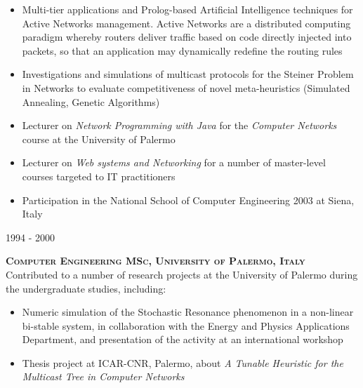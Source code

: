 \documentclass[11pt]{article}
\renewcommand{\subsection}[2]%
        {
         {\bf{\raggedright \scshape #1}}{\bf{\hfill \scshape #2}}\\[-.7\baselineskip]
}
\newenvironment{CompactItemize} {
  \begin{itemize}
  \setlength{\itemsep}{-3pt}
  \setlength{\parsep}{0pt}
  \setlength{\topsep}{-2pt}
  \setlength{\partopsep}{-2pt}
} {\end{itemize}}
\begin{document}
\begin{CompactItemize}
\item Multi-tier applications and Prolog-based Artificial Intelligence techniques for Active Networks management.
  Active Networks are a distributed computing paradigm whereby routers deliver traffic based on code directly
  injected into packets, so that an application may dynamically redefine the routing rules
\item Investigations and simulations of multicast protocols for the Steiner Problem in Networks
  to evaluate competitiveness of novel meta-heuristics (Simulated Annealing, Genetic Algorithms)
\item Lecturer on \emph{Network Programming with Java} for the \emph{Computer Networks} course at the University of Palermo
\item Lecturer on \emph{Web systems and Networking} for a number of master-level courses targeted to IT practitioners
\item Participation in the National School of Computer Engineering 2003 at Siena, Italy
\end{CompactItemize}

\subsection{1994 - 2000}{Computer Engineering MSc, University of Palermo, Italy}

Contributed to a number of research projects at the University of Palermo during the undergraduate studies, including:

\begin{CompactItemize}
\item Numeric simulation of the Stochastic Resonance phenomenon in a non-linear bi-stable system,
  in collaboration with the Energy and Physics Applications Department, and presentation of the activity at an international workshop
\item Thesis project at ICAR-CNR, Palermo, about \emph{A Tunable Heuristic for the Multicast
  Tree in Computer Networks}
\end{CompactItemize}

%
\end{document}
